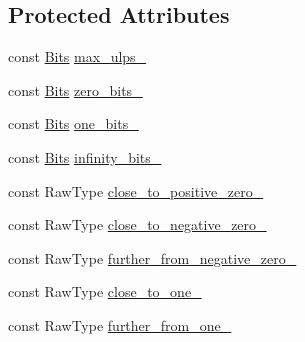 \subsection*{Protected Attributes}
\begin{DoxyCompactItemize}
\item 
const \mbox{\hyperlink{classtesting_1_1gmock__matchers__test_1_1_floating_point_test_addf899bd832ae51103198d201d2f2ea2}{Bits}} \mbox{\hyperlink{classtesting_1_1gmock__matchers__test_1_1_floating_point_test_a06a8b1532af8e5a44aa0af8f73aba8fd}{max\+\_\+ulps\+\_\+}}
\item 
const \mbox{\hyperlink{classtesting_1_1gmock__matchers__test_1_1_floating_point_test_addf899bd832ae51103198d201d2f2ea2}{Bits}} \mbox{\hyperlink{classtesting_1_1gmock__matchers__test_1_1_floating_point_test_afb9b6beb1f152693155cf7db4e1fc4d2}{zero\+\_\+bits\+\_\+}}
\item 
const \mbox{\hyperlink{classtesting_1_1gmock__matchers__test_1_1_floating_point_test_addf899bd832ae51103198d201d2f2ea2}{Bits}} \mbox{\hyperlink{classtesting_1_1gmock__matchers__test_1_1_floating_point_test_ae26de8492d307d2b4c30f6b952d9a412}{one\+\_\+bits\+\_\+}}
\item 
const \mbox{\hyperlink{classtesting_1_1gmock__matchers__test_1_1_floating_point_test_addf899bd832ae51103198d201d2f2ea2}{Bits}} \mbox{\hyperlink{classtesting_1_1gmock__matchers__test_1_1_floating_point_test_a3c25f403d51e6c8ed3fe7856cab1330b}{infinity\+\_\+bits\+\_\+}}
\item 
const Raw\+Type \mbox{\hyperlink{classtesting_1_1gmock__matchers__test_1_1_floating_point_test_a750555206ab9d5959d6dc84f8a760c57}{close\+\_\+to\+\_\+positive\+\_\+zero\+\_\+}}
\item 
const Raw\+Type \mbox{\hyperlink{classtesting_1_1gmock__matchers__test_1_1_floating_point_test_a641f5e223c25b6d6fb108b322acaa39d}{close\+\_\+to\+\_\+negative\+\_\+zero\+\_\+}}
\item 
const Raw\+Type \mbox{\hyperlink{classtesting_1_1gmock__matchers__test_1_1_floating_point_test_acc020c4d830d9e9d910b92bb466d540f}{further\+\_\+from\+\_\+negative\+\_\+zero\+\_\+}}
\item 
const Raw\+Type \mbox{\hyperlink{classtesting_1_1gmock__matchers__test_1_1_floating_point_test_a34c97dc5dc07ea62764de87fdd8b7764}{close\+\_\+to\+\_\+one\+\_\+}}
\item 
const Raw\+Type \mbox{\hyperlink{classtesting_1_1gmock__matchers__test_1_1_floating_point_test_a049ba2d5d371e8aea6ada1ab5312b1bb}{further\+\_\+from\+\_\+one\+\_\+}}

\end{DoxyCompactItemize}
